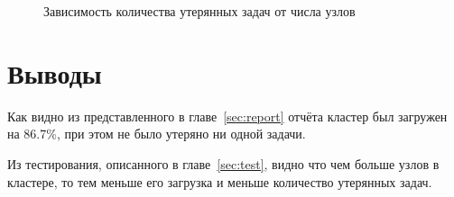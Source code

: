 \documentclass[12pt,a4paper,oneside]{extarticle}
\begin{document}
        \begin{figure}[h!]        
        \centering
        \caption{Зависимость количества утерянных задач от числа узлов}
        \label{pic:test2}
        \end{figure}

\section{Выводы}
    Как видно из представленного в главе~\ref{sec:report} отчёта кластер был загружен на 86.7\%, при этом не было утеряно ни одной задачи.

    Из тестирования, описанного в главе~\ref{sec:test}, видно что чем больше узлов в кластере, то тем меньше его загрузка и меньше количество утерянных задач.
    
\end{document}
